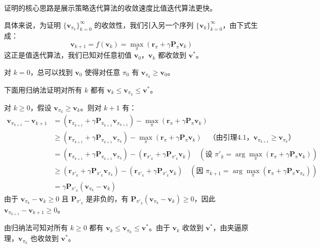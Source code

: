 \documentclass[UTF8]{article}
\begin{document}
\begin{proofbox}
    证明的核心思路是展示策略迭代算法的收敛速度比值迭代算法更快。

    具体来说，为证明 $\{\boldsymbol{v}_{\pi_k}\}_{k=0}^\infty$ 的收敛性，我们引入另一个序列 $\{\boldsymbol{v}_k\}_{k=0}^\infty$，由下式生成：
    \[
    \boldsymbol{v}_{k+1} = f(\boldsymbol{v}_k) = \max_{\pi} (\boldsymbol{r}_\pi + \gamma \boldsymbol{P}_\pi \boldsymbol{v}_k)
    \]
    这正是值迭代算法，我们已知对任意初值 $\boldsymbol{v}_0$，$\boldsymbol{v}_k$ 都收敛到 $\boldsymbol{v}^*$。

    对 $k = 0$，总可以找到 $\boldsymbol{v}_0$ 使得对任意 $\pi_0$ 有 $\boldsymbol{v}_{\pi_0} \geq \boldsymbol{v}_0$。

    下面用归纳法证明对所有 $k$ 都有 $\boldsymbol{v}_k \leq \boldsymbol{v}_{\pi_k} \leq \boldsymbol{v}^*$。

    对 $k \geq 0$，假设 $\boldsymbol{v}_{\pi_k} \geq \boldsymbol{v}_k$。则对 $k+1$ 有：
    \[
    \begin{aligned}
    \boldsymbol{v}_{\pi_{k+1}} - \boldsymbol{v}_{k+1}
    &= (\boldsymbol{r}_{\pi_{k+1}} + \gamma \boldsymbol{P}_{\pi_{k+1}} \boldsymbol{v}_{\pi_{k+1}}) - \max_{\pi} (\boldsymbol{r}_\pi + \gamma \boldsymbol{P}_\pi \boldsymbol{v}_k) \\
    &\geq (\boldsymbol{r}_{\pi_{k+1}} + \gamma \boldsymbol{P}_{\pi_{k+1}} \boldsymbol{v}_{\pi_k}) - \max_{\pi} (\boldsymbol{r}_\pi + \gamma \boldsymbol{P}_\pi \boldsymbol{v}_k) \quad \text{（由引理4.1，$\boldsymbol{v}_{\pi_{k+1}} \geq \boldsymbol{v}_{\pi_k}$）}\\
    &= (\boldsymbol{r}_{\pi_{k+1}} + \gamma \boldsymbol{P}_{\pi_{k+1}} \boldsymbol{v}_{\pi_k}) - (\boldsymbol{r}_{\pi'_k} + \gamma \boldsymbol{P}_{\pi'_k} \boldsymbol{v}_k) \quad (\text{设 } \pi'_k = \arg\max_\pi (\boldsymbol{r}_\pi + \gamma \boldsymbol{P}_\pi \boldsymbol{v}_k)) \\
    &\geq (\boldsymbol{r}_{\pi'_k} + \gamma \boldsymbol{P}_{\pi'_k} \boldsymbol{v}_{\pi_k}) - (\boldsymbol{r}_{\pi'_k} + \gamma \boldsymbol{P}_{\pi'_k} \boldsymbol{v}_k) \quad (\text{因 } \pi_{k+1} = \arg\max_\pi (\boldsymbol{r}_\pi + \gamma \boldsymbol{P}_\pi \boldsymbol{v}_{\pi_k})) \\
    &= \gamma \boldsymbol{P}_{\pi'_k} (\boldsymbol{v}_{\pi_k} - \boldsymbol{v}_k)
    \end{aligned}
    \]
    由于 $\boldsymbol{v}_{\pi_k} - \boldsymbol{v}_k \geq 0$ 且 $\boldsymbol{P}_{\pi'_k}$ 是非负的，有 $\boldsymbol{P}_{\pi'_k} (\boldsymbol{v}_{\pi_k} - \boldsymbol{v}_k) \geq 0$，因此 $\boldsymbol{v}_{\pi_{k+1}} - \boldsymbol{v}_{k+1} \geq 0$。

    由归纳法可知对所有 $k \geq 0$ 都有 $\boldsymbol{v}_k \leq \boldsymbol{v}_{\pi_k} \leq \boldsymbol{v}^*$。由于 $\boldsymbol{v}_k$ 收敛到 $\boldsymbol{v}^*$，由夹逼原理，$\boldsymbol{v}_{\pi_k}$ 也收敛到 $\boldsymbol{v}^*$。
\end{proofbox}
\end{document}
